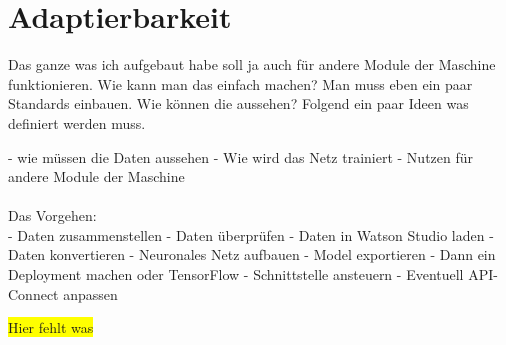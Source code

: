 \chapter{Adaptierbarkeit}
Das ganze was ich aufgebaut habe soll ja auch für andere Module der Maschine funktionieren. Wie kann man das einfach
machen? Man muss eben ein paar Standards einbauen. Wie können die aussehen? Folgend ein paar Ideen was definiert werden
muss.

- wie müssen die Daten aussehen
- Wie wird das Netz trainiert
- Nutzen für andere Module der Maschine\\ \\

Das Vorgehen: \\
- Daten zusammenstellen
- Daten überprüfen
- Daten in Watson Studio laden
- Daten konvertieren
- Neuronales Netz aufbauen
- Model exportieren
- Dann ein Deployment machen oder TensorFlow
- Schnittstelle ansteuern
- Eventuell API-Connect anpassen

\colorbox{yellow}{Hier fehlt was}